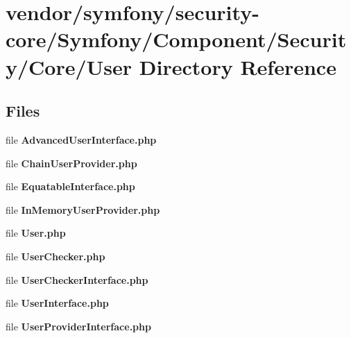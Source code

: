 \section{vendor/symfony/security-\/core/\+Symfony/\+Component/\+Security/\+Core/\+User Directory Reference}
\label{dir_d9ae3d4c6149fd15a08dc32b865b332a}
\subsection*{Files}
\begin{DoxyCompactItemize}
\item 
file {\bf Advanced\+User\+Interface.\+php}
\item 
file {\bf Chain\+User\+Provider.\+php}
\item 
file {\bf Equatable\+Interface.\+php}
\item 
file {\bf In\+Memory\+User\+Provider.\+php}
\item 
file {\bf User.\+php}
\item 
file {\bf User\+Checker.\+php}
\item 
file {\bf User\+Checker\+Interface.\+php}
\item 
file {\bf User\+Interface.\+php}
\item 
file {\bf User\+Provider\+Interface.\+php}
\end{DoxyCompactItemize}
